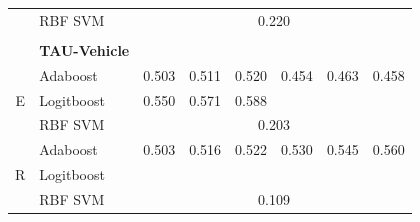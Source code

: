 \documentclass[12pt]{article}
\begin{document}
\begin{sloppypar}
\begin{table}[hbt!]
\begin{tabular}{lllllllll}
                                       & \multicolumn{2}{l}{RBF SVM}              & \multicolumn{6}{c}{0.220}                                                                                                                                                                                     \\
\multicolumn{9}{l}{}                                                                                                                                                                                                                                                                              \\
                                       & \multicolumn{2}{l}{\textbf{TAU-Vehicle}} & \multicolumn{6}{l}{}                                                                                                                                                                                          \\
\multicolumn{1}{c}{\multirow{3}{*}{E}} & \multicolumn{2}{l}{Adaboost}             & 0.503                           & 0.511                            & 0.520                            & 0.454                           & 0.463                            & 0.458                            \\
\multicolumn{1}{c}{}                   & \multicolumn{2}{l}{Logitboost}           & 0.550                           & 0.571                            & 0.588                            &                                 &                                  &                                  \\
\multicolumn{1}{c}{}                   & \multicolumn{2}{l}{RBF SVM}              & \multicolumn{6}{c}{0.203}                                                                                                                                                                                     \\
\multirow{3}{*}{R}                     & \multicolumn{2}{l}{Adaboost}             & 0.503                           & 0.516                            & 0.522                            & 0.530                           & 0.545                            & 0.560                            \\
                                       & \multicolumn{2}{l}{Logitboost}           &                                 &                                  &                                  &                                 &                                  &                                  \\
                                       & \multicolumn{2}{l}{RBF SVM}              & \multicolumn{6}{c}{0.109}                                                                                                                                                                                     \\ \hline
\end{tabular}
\end{table}


\end{sloppypar}
\end{document}
